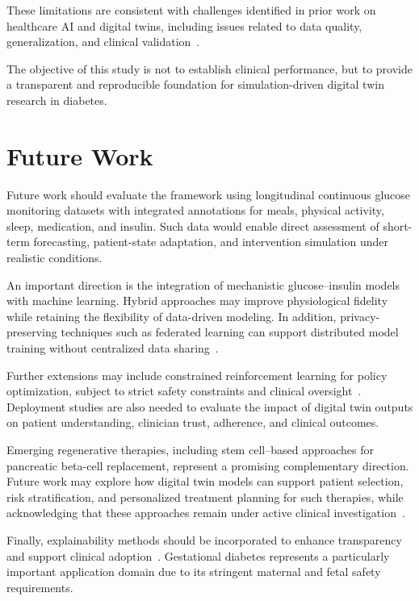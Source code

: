 \documentclass[journal]{IEEEtran}
\begin{document}
These limitations are consistent with challenges identified in prior work on healthcare AI and digital twins, including issues related to data quality, generalization, and clinical validation~\cite{ref7,ref8,ref13,ref21,ref22}.

The objective of this study is not to establish clinical performance, but to provide a transparent and reproducible foundation for simulation-driven digital twin research in diabetes.

\section{Future Work}
Future work should evaluate the framework using longitudinal continuous glucose monitoring datasets with integrated annotations for meals, physical activity, sleep, medication, and insulin. Such data would enable direct assessment of short-term forecasting, patient-state adaptation, and intervention simulation under realistic conditions.

An important direction is the integration of mechanistic glucose–insulin models with machine learning. Hybrid approaches may improve physiological fidelity while retaining the flexibility of data-driven modeling. In addition, privacy-preserving techniques such as federated learning can support distributed model training without centralized data sharing~\cite{ref11}.

Further extensions may include constrained reinforcement learning for policy optimization, subject to strict safety constraints and clinical oversight~\cite{ref33,ref34}. Deployment studies are also needed to evaluate the impact of digital twin outputs on patient understanding, clinician trust, adherence, and clinical outcomes.

Emerging regenerative therapies, including stem cell–based approaches for pancreatic beta-cell replacement, represent a promising complementary direction. Future work may explore how digital twin models can support patient selection, risk stratification, and personalized treatment planning for such therapies, while acknowledging that these approaches remain under active clinical investigation~\cite{ref39}.

Finally, explainability methods should be incorporated to enhance transparency and support clinical adoption~\cite{ref35,ref36,ref37}. Gestational diabetes represents a particularly important application domain due to its stringent maternal and fetal safety requirements.
\end{document}
